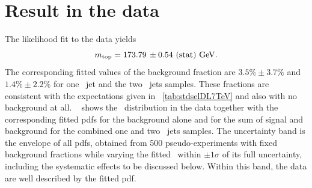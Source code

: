 \section{Result in the data}

The likelihood fit to the data yields
%
\[
 m_{\mathrm{top}} = 173.79\,\pm 0.54~\mathrm{(stat)}~\mathrm{GeV}.
\]
%
The corresponding fitted values of the background fraction are $3.5\% \pm 3.7\%$ and $1.4\% \pm 2.2\%$ for one \btagged\ jet and the two \btagged\ jets samples. 
%
These fractions are consistent with the expectations given in \tab~\ref{tab:stdselDL7TeV} and also with no background at all. 
%
\Fig~ shows the \mlbr\ distribution in the data together with the corresponding fitted \glspl{pdf} for the background alone and for the sum of signal and background for the combined one and two \btagged\ jets samples. 
%
The uncertainty band is the envelope of all \glspl{pdf}, obtained from 500 pseudo-experiments with fixed background fractions while varying the fitted \mt\ within $\pm 1\sigma$ of its full uncertainty, including the systematic effects to be discussed below. 
%
Within this band, the data are well described by the fitted \gls{pdf}.
%


